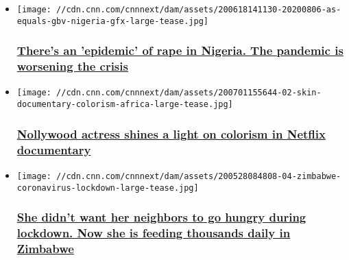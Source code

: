 \begin{itemize}
\item
  \href{/2020/06/23/africa/asequals-nigeria-rape-sexual-violence-intl/index.html}{}

  \texttt{[image: //cdn.cnn.com/cnnnext/dam/assets/200618141130-20200806-as-equals-gbv-nigeria-gfx-large-tease.jpg]}

  \hypertarget{theres-an-epidemic-of-rape-in-nigeria-the-pandemic-is-worsening-the-crisis}{%
  \subsubsection{\texorpdfstring{\href{/2020/06/23/africa/asequals-nigeria-rape-sexual-violence-intl/index.html}{There's
  an 'epidemic' of rape in Nigeria. The pandemic is worsening the
  crisis}}{There's an 'epidemic' of rape in Nigeria. The pandemic is worsening the crisis}}\label{theres-an-epidemic-of-rape-in-nigeria-the-pandemic-is-worsening-the-crisis}}
\end{itemize}

\begin{itemize}
\item
  \href{/2020/07/03/africa/colorism-documentary-africa/index.html}{}

  \texttt{[image: //cdn.cnn.com/cnnnext/dam/assets/200701155644-02-skin-documentary-colorism-africa-large-tease.jpg]}

  \hypertarget{nollywood-actress-shines-a-light-on-colorism-in-netflix-documentary}{%
  \subsubsection{\texorpdfstring{\href{/2020/07/03/africa/colorism-documentary-africa/index.html}{Nollywood
  actress shines a light on colorism in Netflix
  documentary}}{Nollywood actress shines a light on colorism in Netflix documentary}}\label{nollywood-actress-shines-a-light-on-colorism-in-netflix-documentary}}
\end{itemize}

\begin{itemize}
\item
  \href{/2020/06/18/africa/zimbabwe-coronavirus-lockdown-intl/index.html}{}

  \texttt{[image: //cdn.cnn.com/cnnnext/dam/assets/200528084808-04-zimbabwe-coronavirus-lockdown-large-tease.jpg]}

  \hypertarget{she-didnt-want-her-neighbors-to-go-hungry-during-lockdown-now-she-is-feeding-thousands-daily-in-zimbabwe}{%
  \subsubsection{\texorpdfstring{\href{/2020/06/18/africa/zimbabwe-coronavirus-lockdown-intl/index.html}{She
  didn't want her neighbors to go hungry during lockdown. Now she is
  feeding thousands daily in
  Zimbabwe}}{She didn't want her neighbors to go hungry during lockdown. Now she is feeding thousands daily in Zimbabwe}}\label{she-didnt-want-her-neighbors-to-go-hungry-during-lockdown-now-she-is-feeding-thousands-daily-in-zimbabwe}}
\end{itemize}

